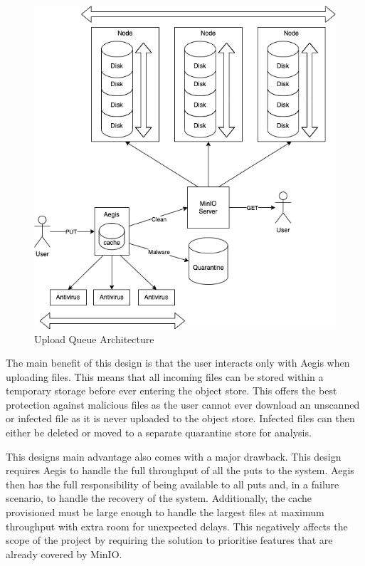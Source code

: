 \documentclass[12pt, conference, final, a4paper, onecolumn, compsoc]{IEEEtran}
\begin{document}
    \begin{figure}
      \centering \includegraphics[scale=.4]{diagrams/upload-queue.png}
      \caption{Upload Queue Architecture}
      \label{fig:uploadQueueArch}
    \end{figure}

    The main benefit of this design is that the user interacts only with Aegis
    when uploading files. This means that all incoming files can be stored
    within a temporary storage before ever entering the object store. This
    offers the best protection against malicious files as the user cannot ever
    download an unscanned or infected file as it is never uploaded to the object
    store. Infected files can then either be deleted or moved to a separate
    quarantine store for analysis.

    This designs main advantage also comes with a major drawback. This design
    requires Aegis to handle the full throughput of all the puts to the system.
    Aegis then has the full responsibility of being available to all puts and,
    in a failure scenario, to handle the recovery of the system. Additionally,
    the cache provisioned must be large enough to handle the largest files at
    maximum throughput with extra room for unexpected delays. This negatively
    affects the scope of the project by requiring the solution to prioritise
    features that are already covered by MinIO.
\end{document}
